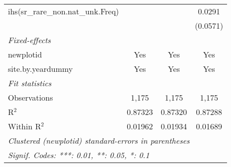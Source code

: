 \begin{table}[htbp]
\begin{tabular}{lccc}
      ihs(sr\_rare\_non.nat\_unk.Freq)        &                &                & 0.0291\\   
                                              &                &                & (0.0571)\\   
      \midrule
      \emph{Fixed-effects}\\
      newplotid                               & Yes            & Yes            & Yes\\  
      site.by.yeardummy                       & Yes            & Yes            & Yes\\  
      \midrule
      \emph{Fit statistics}\\
      Observations                            & 1,175          & 1,175          & 1,175\\  
      R$^2$                                   & 0.87323        & 0.87320        & 0.87288\\  
      Within R$^2$                            & 0.01962        & 0.01934        & 0.01689\\  
      \midrule \midrule
      \multicolumn{4}{l}{\emph{Clustered (newplotid) standard-errors in parentheses}}\\
      \multicolumn{4}{l}{\emph{Signif. Codes: ***: 0.01, **: 0.05, *: 0.1}}\\
   \end{tabular}
\end{table}


